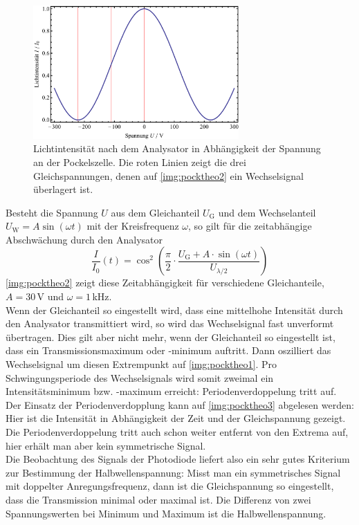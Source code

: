 \begin{figure}[H]
\begin{center}
  \includegraphics[width=0.7\textwidth]{../img/Pocktheo1.pdf}
  \caption{Lichtintensität nach dem Analysator in Abhängigkeit der Spannung an der Pockelszelle.
  Die roten Linien zeigt die drei Gleichspannungen, denen auf \autoref{img:pocktheo2} ein Wechselsignal
  überlagert ist.}
  \label{img:pocktheo1}
\end{center}
\end{figure}

Besteht die Spannung $U$ aus dem Gleichanteil $U_\text{G}$ und dem Wechselanteil
\mbox{$U_\text{W}=A\sin(\omega t)$}
mit der Kreisfrequenz $\omega$,
so gilt für die zeitabhängige Abschwächung durch den Analysator
\begin{equation}
\label{eq:intt}
  \frac{I}{I_0}(t)=\cos^2(\frac{\pi}{2} \cdot \frac{U_\text{G} + A\cdot\sin(\omega t)}{U_{\lambda / 2}})
\end{equation}
\autoref{img:pocktheo2} zeigt diese Zeitabhängigkeit für verschiedene Gleichanteile,
\mbox{$A=30$\,V} und $\omega=1$\,kHz.\\
Wenn der Gleichanteil so eingestellt wird,
dass eine mittelhohe Intensität durch den Analysator transmittiert wird,
so wird das Wechselsignal fast unverformt übertragen.
Dies gilt aber nicht mehr, wenn der Gleichanteil so eingestellt ist,
dass ein Transmissionsmaximum oder -minimum auftritt.
Dann oszilliert das Wechselsignal um diesen Extrempunkt auf \autoref{img:pocktheo1}.
Pro Schwingungsperiode des Wechselsignals wird somit zweimal ein Intensitätsminimum bzw. -maximum erreicht:
Periodenverdoppelung tritt auf.\\
Der Einsatz der Periodenverdopplung kann auf \autoref{img:pocktheo3} abgelesen werden:
Hier ist die Intensität in Abhängigkeit der Zeit und der Gleichspannung gezeigt.
Die Periodenverdoppelung tritt auch schon weiter entfernt von den Extrema auf,
hier erhält man aber kein symmetrische Signal.\\
Die Beobachtung des Signals der Photodiode liefert also ein sehr gutes Kriterium zur
Bestimmung der Halbwellenspannung:
Misst man ein symmetrisches Signal mit doppelter Anregungsfrequenz,
dann ist die Gleichspannung so eingestellt,
dass die Transmission minimal oder maximal ist.
Die Differenz von zwei Spannungswerten bei Minimum und Maximum ist die Halbwellenspannung.

